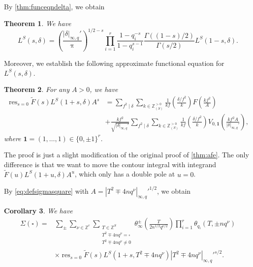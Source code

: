 \documentclass[10pt,oneside,reqno]{amsart}
\makeatletter
\newcommand\ZZ{\mathbb{Z}}
\DeclareMathOperator\res{res}
\newcommand\legendresymbol[2]{\genfrac{(}{)}{}{}{#1}{#2}}
\theoremstyle{THEOREM}
\newtheorem{theorem}{Theorem}[section]
\newtheorem{corollary}[theorem]{Corollary}
\theoremstyle{DEFINITION}
\theoremstyle{EXERCISE}
\numberwithin{equation}{section}
\renewenvironment{proof}[1][\proofname]{\par
  \vspace{-6pt}
  \pushQED{\qed}
  \normalfont \topsep6\p@\@plus6\p@\relax
  \trivlist
  \item[\hskip\labelsep\rmfamily\bfseries
    #1\@addpunct{:}]\ignorespaces
}{
  \popQED\endtrivlist\@endpefalse
  \vspace{-6pt}
}
\makeatother
\begin{document}
By \autoref{thm:funceqndelta}, we obtain
\begin{theorem}\label{thm:funceqndeltasquare}
We have
\begin{equation}\label{eq:funceqndeltasquare}
L^{S}(s,\delta)=\legendresymbol{|\delta|_{\infty,q}'}{\uppi}^{1/2-s} \prod_{i=1}^{r}\frac{1-q_i^{-s}}{1-q_i^{s-1}} \frac{\Gamma((1-s)/2)}{\Gamma(s/2)}L^{S}(1-s,\delta).
\end{equation}
\end{theorem}
Moreover, we establish the following approximate functional equation for $L^S(s,\delta)$.
\begin{theorem}\label{thm:afesquare}
For any $A>0$, we have
\begin{equation}\label{eq:approximatefesquare}
\begin{split}
   \res_{s=0}\widetilde{F}(s)L^{S}(1+s,\delta)A^s& =\sum_{f^2\mid \delta}\sum_{k\in \ZZ_{(S)}^{>0}}\frac{1}{kf}\legendresymbol{\delta/f^2}{k}F\legendresymbol{kf^2}{A}\\
     & +\frac{kf^2}{\sqrt{|\delta|_{\infty,q}'}}\sum_{f^2\mid \delta}\sum_{k\in \ZZ_{(S)}^{>0}}\frac{1}{kf}\legendresymbol{\delta/f^2}{k}V_{0,\mathbf{1}}\legendresymbol{kf^2A}{|\delta|_{\infty,q}'},
\end{split}
\end{equation}
where $\mathbf{1}=(1,\dots,1)\in \{0,\pm 1\}^r$.
\end{theorem}
\begin{proof}
The proof is just a slight modification of the original proof of \autoref{thm:afe}. The only difference is that we want to move the contour integral with integrand $\widetilde{F}(u)L^{S}(1+u,\delta)A^u$, which only has a double pole at $u=0$.
\end{proof}
By \eqref{eq:defsigmasquare} with $A=|T^2\mp 4nq^\nu|_{\infty,q}'^{1/2}$, we obtain
\begin{corollary}\label{cor:sigmasquarel}
We have
\begin{equation}\label{eq:sigmasquarel}
\begin{split}
   \Sigma(\square)= &\sum_{\pm}\sum_{\nu\in \ZZ^r}\sum_{\substack{T\in \ZZ^S\\ T^2\mp 4nq^\nu= \square\\ T^2\mp 4nq^\nu\neq 0}}\theta_\infty^\pm\legendresymbol{T}{2n^{1/2}q^{\nu/2}}
    \prod_{i=1}^{r}\theta_{q_i}(T,\pm nq^\nu) \\
     & \times \res_{s=0}\widetilde{F}(s)L^{S}(1+s,T^2\mp 4nq^\nu)|T^2\mp 4nq^\nu|_{\infty,q}'^{s/2}.
\end{split}
\end{equation}
\end{corollary}
\end{document}
